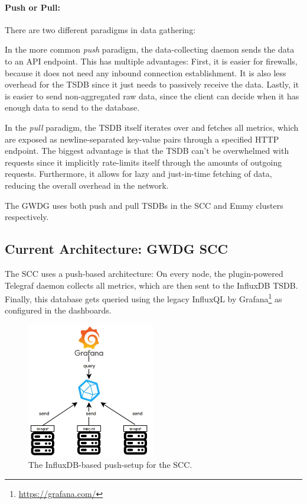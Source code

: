 \paragraph{Push or Pull:} There are two different paradigms in data gathering:

In the more common \emph{push} paradigm, the data-collecting daemon sends the data to an API 
endpoint. This has multiple advantages: First, it is easier for firewalls, because it does not
need any inbound connection establishment. It is also less overhead for the \ac{TSDB} since it
just needs to passively receive the data. Lastly, it is easier to send non-aggregated raw data,
since the client can decide when it has enough data to send to the database.

In the \emph{pull} paradigm, the \ac{TSDB} itself iterates over and fetches all metrics, which
are exposed as newline-separated key-value pairs through a specified HTTP endpoint. The biggest
advantage is that the \ac{TSDB} can't be overwhelmed with requests since it implicitly rate-limits
itself through the amounts of outgoing requests. Furthermore, it allows for lazy and just-in-time 
fetching of data, reducing the overall overhead in the network.

The \ac{GWDG} uses both push and pull \acp{TSDB} in the \ac{SCC} and Emmy clusters respectively. 

\subsection{Current Architecture: GWDG SCC}

The \ac{SCC} uses a push-based architecture: On every node, the plugin-powered Telegraf 
daemon collects all metrics, which are then sent to the InfluxDB \ac{TSDB}. Finally, this database
gets queried using the legacy InfluxQL by Grafana\footnote{\url{https://grafana.com/}} as 
configured in the dashboards.

\begin{figure}[H]
  \centering
  \includegraphics[width=0.5\textwidth]{./assets/influx.jpeg}
  \caption{The InfluxDB-based push-setup for the SCC.}
\end{figure}



